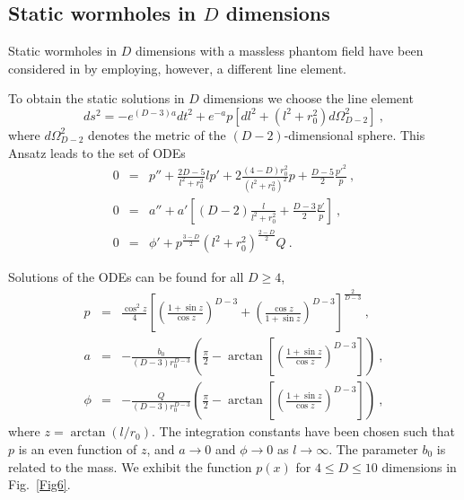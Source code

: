 \documentclass[showpacs,preprintnumbers,amsmath,amssymb,floatfix]{revtex4}
\begin{document}
\begin{appendix}
\section{Static wormholes in $D$ dimensions}
\setcounter{equation}{0}

Static wormholes in $D$ dimensions with a massless phantom field
have been considered in \cite{Shinkai:2013} by
employing, however, a different line element.

To obtain the static solutions in $D$ dimensions we choose the line element
\begin{equation}
ds^2 = -e^{(D-3)a} dt^2 +e^{-a}p\left[ dl^2 +(l^2+r_0^2) d\Omega_{D-2}^2\right] \ ,
\end{equation}
where $d\Omega_{D-2}^2$ denotes the metric of the $(D-2)$-dimensional sphere.
%
This Ansatz leads to the set of ODEs
\begin{eqnarray}
0 & = & p''+ \frac{2D-5}{l^2+r_0^2} l p' +2\frac{(4-D)r_0^2}{(l^2+r_0^2)^2} p +
       \frac{D-5}{2}\frac{p'^2}{p} \ ,
\label{Dpeq}\\  
0 & = & a''  + a'\left[(D-2) \frac{l}{l^2+r_0^2} + \frac{D-3}{2}\frac{p'}{p}\right] \ ,
\label{Daeq}\\  
0 & = & \phi'  + p^{\frac{3-D}{2}}(l^2+r_0^2)^{\frac{2-D}{2}}Q \ .
\label{Dphieq}
\end{eqnarray}
%


Solutions of the ODEs can be found for all $D\geq 4$,
\begin{eqnarray}
p & = & \frac{\cos^2 z}{4}
\left[ \left(\frac{1+\sin z}{\cos z}\right)^{D-3} + 
       \left(\frac{\cos z}{1+\sin z}\right)^{D-3} \right]^{\frac{2}{D-3}} \ ,
\label{solpd}\\
a & = &
-\frac{b_0}{(D-3)r_0^{D-3}}\left(\frac{\pi}{2}
-\arctan\left[\left(\frac{1+\sin z}{\cos z}\right)^{D-3}\right] \right)\ ,
\label{sola2} \\
\phi & = &
-\frac{Q}{(D-3)r_0^{D-3}}\left(\frac{\pi}{2}
-\arctan\left[\left(\frac{1+\sin z}{\cos z}\right)^{D-3}\right] \right)\ ,
\label{solphi} 
\end{eqnarray}
where $z=\arctan(l/r_0)$. 
The integration constants have been chosen such that $p$ is an even function
of $z$,
and  $a \to 0$ and $\phi\to 0$ as $l\to\infty$.
The parameter $b_0$ is related to the mass. We exhibit the function $p(x)$ for $4 \le D \le 10$
dimensions in Fig.~\ref{Fig6}.


\end{appendix}
\end{document}

